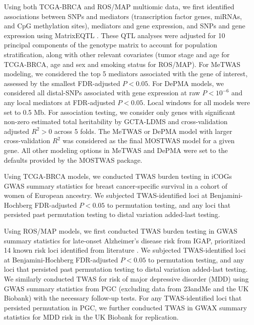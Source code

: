 Using both TCGA-BRCA and
ROS/MAP multiomic
data, we first identified
associations between
SNPs and mediators (transcription
factor genes, miRNAs, and
CpG methylation sites),
mediators and gene expression,
and SNPs and gene expression
using MatrixEQTL
\cite{Shabalin2012a}.
These QTL analyses were
adjusted for 10 principal
components of the genotype
matrix to account for 
population stratification,
along with other relevant
covariates (tumor stage and age
for TCGA-BRCA, age and sex and smoking status for ROS/MAP).
For MeTWAS modeling, we considered
the top 5 mediators associated
with the gene of interest, assessed
by the smallest FDR-adjusted $P < 0.05$.
For DePMA models, we considered
all distal-SNPs
associated with gene expression
at raw $P < 10^{-6}$
and any local mediators at
FDR-adjusted $P < 0.05$.
Local windows for all models
were set to 0.5 Mb. For association
testing, we consider
only genes with significant 
non-zero
estimated total
heritability by
GCTA-LDMS \cite{Yang2015}
and cross-validation
adjusted $R^2 > 0$
across 5 folds.
The MeTWAS or DePMA
model with larger cross-validation
$R^2$ was considered
as the final MOSTWAS model
for a given gene. All
other modeling options
in MeTWAS and DePMA
were set to the defaults
provided by the MOSTWAS package.

Using TCGA-BRCA models,
we conducted TWAS burden testing
\cite{Pasaniuc2014FastEnrichment,Gusev2016} in iCOGs
GWAS summary statistics
for breast cancer-specific
survival in a cohort
of women of European ancestry.
We subjected TWAS-identified loci
at Benjamini-Hochberg \cite{Benjamini1995} 
FDR-adjusted $P < 0.05$
to permutation testing,
and any loci that persisted
past permutation testing to
distal variation
added-last testing.

Using ROS/MAP models,
we first conducted 
TWAS burden testing
in GWAS summary statistics
for late-onset
Alzheimer's disease risk
from IGAP, prioritized
14 known risk loci identified
from literature 
\cite{Lambert2013Meta-analysisDisease,Reitz2014GeneticDisease,Sims2017RareDisease,Yuan2017TheDisease}.
We subjected TWAS-identified loci
at Benjamini-Hochberg \cite{Benjamini1995} 
FDR-adjusted $P < 0.05$
to permutation testing,
and any loci that persisted
past permutation testing to
distal variation
added-last testing.
We similarly conducted TWAS
for risk of major
depressive disorder (MDD)
using GWAS summary statistics
from PGC (excluding data
from 23andMe and the UK Biobank)
with the necessary follow-up
tests. For any TWAS-identified loci
that persisted
permutation in PGC,
we further conducted TWAS
in GWAX summary statistics 
for MDD risk in
the UK Biobank
\cite{Liu2017Case-controlDisease}
for replication.
